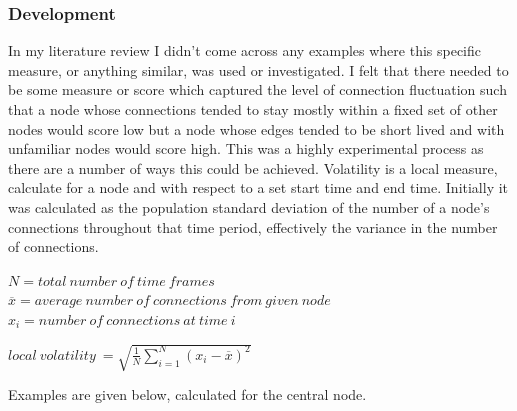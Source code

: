 \subsubsection{Development}

In my literature review I didn’t come across any examples where this specific measure, or anything similar, was used or investigated. I felt that there needed to be some measure or score which captured the level of connection fluctuation such that a node whose connections tended to stay mostly within a fixed set of other nodes would score low but a node whose edges tended to be short lived and with unfamiliar nodes would score high. This was a highly experimental process as there are a number of ways this could be achieved.
Volatility is a local measure, calculate for a node and with respect to a set start time and end time. Initially it was calculated as the population standard deviation of the number of a node’s connections throughout that time period, effectively the variance in the number of connections.

\begin{center}
$N = total\ number\ of\ time\ frames$
$\overline{x} = average\ number\ of\ connections\ from\ given\ node $
$x_i = number\ of\ connections\ at\ time\ i$

$local\ volatility\ = \sqrt{\frac{1}{N} \sum_{i=1}^N (x_i - \overline{x})^2}$
\end{center}

Examples are given below, calculated for the central node.


